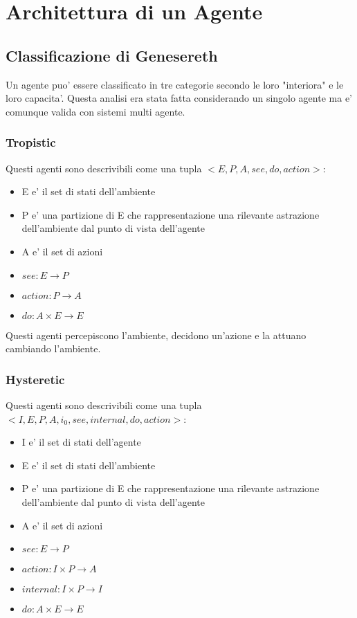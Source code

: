 \chapter{Architettura di un Agente}

\section{Classificazione di Genesereth}

Un agente puo' essere classificato in tre categorie secondo le loro "interiora" e le loro capacita'. Questa analisi era stata fatta considerando un singolo agente ma e' comunque valida con sistemi multi agente.

\subsection{Tropistic}

Questi agenti sono descrivibili come una tupla $<E, P, A, see, do, action>$:

\begin{itemize}
  \item E e' il set di stati dell'ambiente
  \item P e' una partizione di E che rappresentazione una rilevante astrazione dell'ambiente dal punto di vista dell'agente
  \item A e' il set di azioni
  \item $see : E \rightarrow P$
  \item $action : P \rightarrow A$
  \item $do : A \times E \rightarrow E$
\end{itemize}

Questi agenti percepiscono l'ambiente, decidono un'azione e la attuano cambiando l'ambiente.


\subsection{Hysteretic}

Questi agenti sono descrivibili come una tupla $<I, E, P, A, i_0, see, internal, do, action>$:

\begin{itemize}
  \item I e' il set di stati dell'agente
  \item E e' il set di stati dell'ambiente
  \item P e' una partizione di E che rappresentazione una rilevante astrazione dell'ambiente dal punto di vista dell'agente
  \item A e' il set di azioni
  \item $see : E \rightarrow P$
  \item $action : I \times P \rightarrow A$
  \item $internal : I \times P \rightarrow I$
  \item $do : A \times E \rightarrow E$
\end{itemize}

